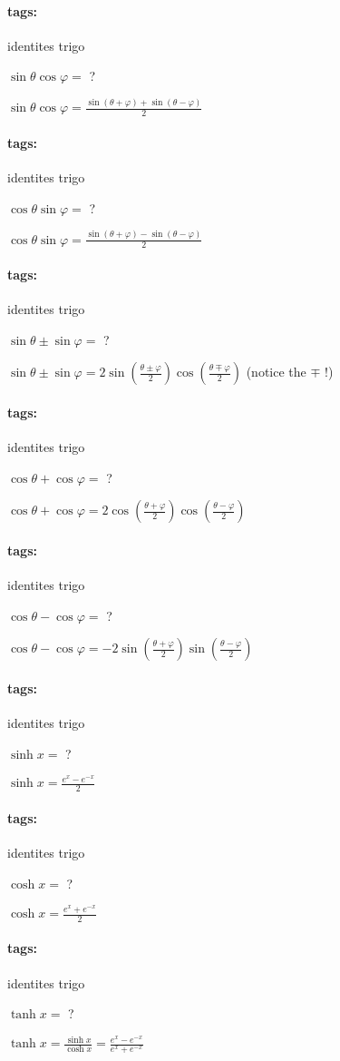 \documentclass[12pt]{article}
\newcommand*{\xfield}[1]{\begin{mdframed}\centering #1\end{mdframed}\bigskip}
\newenvironment{note}{}{}
\newcommand*{\tags}[1]{\paragraph{tags: }#1}
\begin{document}
\begin{note}
	\tags{identites trigo}
    \xfield{$\sin \theta \cos \varphi =$ ?}
    \xfield{$\sin \theta \cos \varphi = \frac{\sin(\theta + \varphi) + \sin(\theta - \varphi)} {2}$}
\end{note}

\begin{note}
	\tags{identites trigo}
    \xfield{$\cos \theta \sin \varphi =$ ?}
    \xfield{$\cos \theta \sin \varphi = \frac{\sin(\theta + \varphi) - \sin(\theta - \varphi)} {2}$}
\end{note}

\begin{note}
	\tags{identites trigo}
    \xfield{$\sin \theta \pm \sin \varphi =$ ?}
    \xfield{$\sin \theta \pm \sin \varphi = 2 \sin\left( \frac{\theta \pm \varphi}{2} \right) \cos\left( \frac{\theta \mp \varphi}{2} \right)$ (notice the $\mp$ !)}
\end{note}

\begin{note}
	\tags{identites trigo}
    \xfield{$\cos \theta + \cos \varphi =$ ?}
    \xfield{$\cos \theta + \cos \varphi = 2 \cos\left( \frac{\theta + \varphi} {2} \right) \cos\left( \frac{\theta - \varphi}{2} \right)$}
\end{note}

\begin{note}
	\tags{identites trigo}
    \xfield{$\cos \theta - \cos \varphi =$ ?}
    \xfield{$\cos \theta - \cos \varphi = -2\sin\left( \frac{\theta + \varphi} {2}\right) \sin\left(\frac {\theta - \varphi}{2}\right)$}
\end{note}

\begin{note}
	\tags{identites trigo}
    \xfield{$\sinh x =$ ?}
    \xfield{$\sinh x = \frac {e^x - e^{-x}} {2}$}
\end{note}

\begin{note}
	\tags{identites trigo}
    \xfield{$\cosh x = $ ?}
    \xfield{$\cosh x = \frac {e^x + e^{-x}} {2}$}
\end{note}

\begin{note}
	\tags{identites trigo}
    \xfield{$\tanh x =$ ?}
    \xfield{$\tanh x = \frac{\sinh x}{\cosh x} = \frac {e^x - e^{-x}} {e^x + e^{-x}}$}
\end{note}
\end{document}

